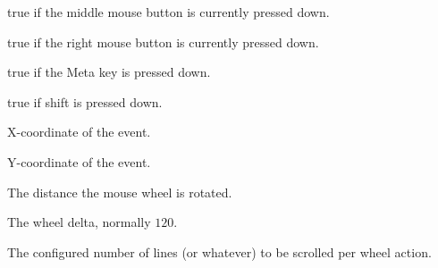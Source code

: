 \label{wxmouseeventmmiddledown}


true if the middle mouse button is currently pressed down.


\label{wxmouseeventmrightdown}


true if the right mouse button is currently pressed down.


\label{wxmouseeventmmetadown}


true if the Meta key is pressed down.


\label{wxmouseeventmshiftdown}


true if shift is pressed down.


\label{wxmouseeventmx}


X-coordinate of the event.


\label{wxmouseeventmy}


Y-coordinate of the event.


\label{wxmouseeventmwheelrotation}


The distance the mouse wheel is rotated.


\label{wxmouseeventmwheeldelta}


The wheel delta, normally $120$.


\label{wxmouseeventmlinesperaction}


The configured number of lines (or whatever) to be scrolled per wheel
action.



\label{wxmouseeventctor}


